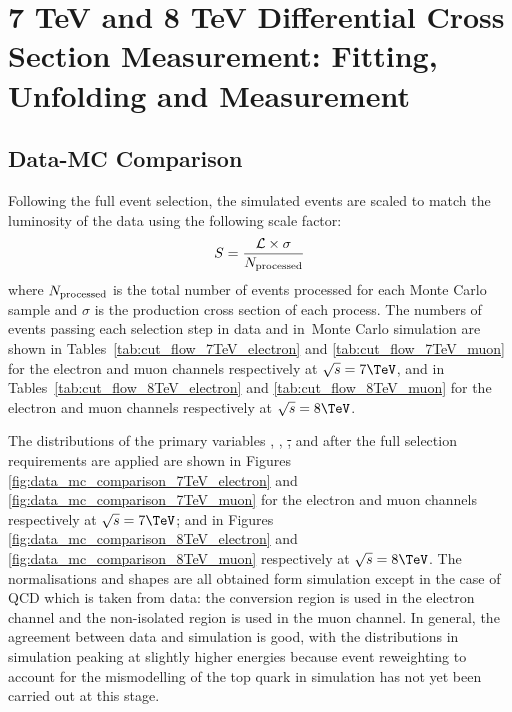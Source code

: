 \chapter{7 TeV and 8 TeV Differential Cross Section Measurement: Fitting, Unfolding and Measurement}
\label{c:Differential_Cross_Section:fitting_and_unfolding}


\section{Data-MC Comparison}
\label{ss:data-mc_comparison}
Following the full event selection, the simulated events are scaled to match the luminosity of the data using
the following scale factor:
\begin{equation}
  S = \frac{{\cal L} \times  \sigma}{N_{\rm processed}}
\end{equation}
where $N_{\rm processed}$ is the total number of events processed for each Monte Carlo sample and $\sigma$ is
the production cross section of each process. The numbers of events passing each selection step in data and
in Monte Carlo simulation are shown in Tables~\ref{tab:cut_flow_7TeV_electron} and
\ref{tab:cut_flow_7TeV_muon} for the electron and muon channels respectively at $\sqrt{s}=7\TeV$, and in
Tables~\ref{tab:cut_flow_8TeV_electron} and \ref{tab:cut_flow_8TeV_muon} for the electron and muon channels
respectively at $\sqrt{s}=8\TeV$.






The distributions of the primary variables \met, \HT, \st, \wpt and \mt after the full selection requirements
are applied are shown in Figures \ref{fig:data_mc_comparison_7TeV_electron} and
\ref{fig:data_mc_comparison_7TeV_muon} for the electron and muon channels respectively at $\sqrt{s}=7\TeV$;
and in Figures \ref{fig:data_mc_comparison_8TeV_electron} and \ref{fig:data_mc_comparison_8TeV_muon}
respectively at $\sqrt{s}=8\TeV$. The normalisations and shapes are all obtained form simulation except in the
case of QCD which is taken from data: the conversion region is used in the electron channel and the
non-isolated region is used in the muon channel. In general, the agreement between data and simulation is
good, with the distributions in simulation peaking at slightly higher energies because event reweighting to
account for the \pt mismodelling of the top quark in simulation has not yet been carried out at this stage.

